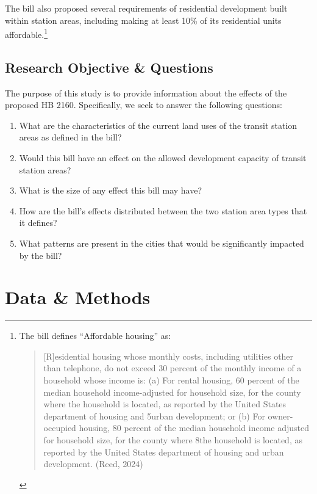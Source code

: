 \documentclass[
]{agujournal2019}
\begin{document}
The bill also proposed several requirements of residential development
built within station areas, including making at least 10\% of its
residential units affordable.\footnote{The bill defines ``Affordable
  housing'' as:

  \begin{quote}
  {[}R{]}esidential housing whose monthly costs, including utilities
  other than telephone, do not exceed 30 percent of the monthly income
  of a household whose income is: (a) For rental housing, 60 percent of
  the median household income-adjusted for household size, for the
  county where the household is located, as reported by the United
  States department of housing and 5urban development; or (b) For
  owner-occupied housing, 80 percent of the median household income
  adjusted for household size, for the county where 8the household is
  located, as reported by the United States department of housing and
  urban development. (Reed, 2024)
  \end{quote}}

\subsection{Research Objective \&
Questions}\label{research-objective-questions}

The purpose of this study is to provide information about the effects of
the proposed HB 2160. Specifically, we seek to answer the following
questions:

\begin{enumerate}
\def\labelenumi{\arabic{enumi}.}
\item
  What are the characteristics of the current land uses of the transit
  station areas as defined in the bill?
\item
  Would this bill have an effect on the allowed development capacity of
  transit station areas?
\item
  What is the size of any effect this bill may have?
\item
  How are the bill's effects distributed between the two station area
  types that it defines?
\item
  What patterns are present in the cities that would be significantly
  impacted by the bill?
\end{enumerate}

\section{Data \& Methods}\label{sec-data-methods}
\end{document}
